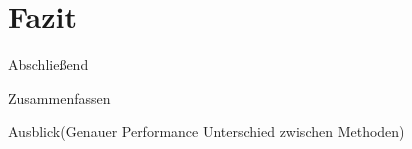 \chapter{Fazit}

Abschließend

Zusammenfassen

Ausblick(Genauer Performance Unterschied zwischen Methoden)

